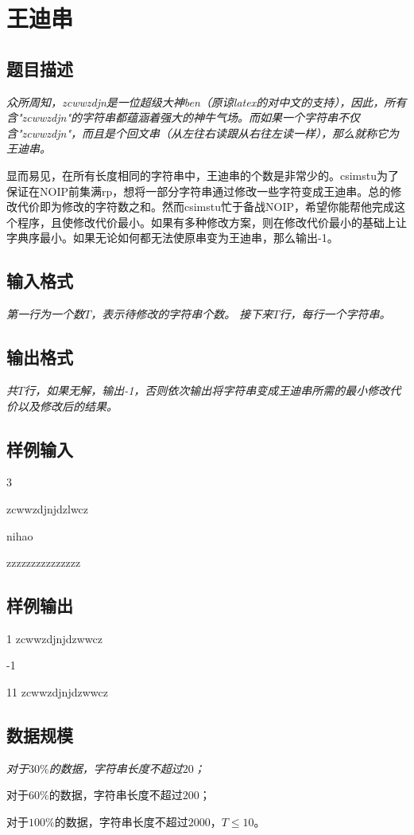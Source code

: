 \section{王迪串}
\subsection{题目描述}
{\it
众所周知，zcwwzdjn是一位超级大神{\color{red}ben}（原谅latex的对中文的支持），因此，所有含"zcwwzdjn"的字符串都蕴涵着强大的神牛气场。而如果一个字符串不仅含"zcwwzdjn"，而且是个回文串（从左往右读跟从右往左读一样），那么就称它为王迪串。\par
显而易见，在所有长度相同的字符串中，王迪串的个数是非常少的。csimstu为了保证在NOIP前集满rp，想将一部分字符串通过修改一些字符变成王迪串。总的修改代价即为修改的字符数之和。然而csimstu忙于备战NOIP，希望你能帮他完成这个程序，且使修改代价最小。如果有多种修改方案，则在修改代价最小的基础上让字典序最小。如果无论如何都无法使原串变为王迪串，那么输出-1。
}
\subsection{输入格式}
{\it
	第一行为一个数$T$，表示待修改的字符串个数。
	接下来$T$行，每行一个字符串。
}
\subsection{输出格式}
{\it
	共$T$行，如果无解，输出-1，否则依次输出将字符串变成王迪串所需的最小修改代价以及修改后的结果。
}
\subsection{样例输入}
3 \par
zcwwzdjnjdzlwcz \par
nihao \par
zzzzzzzzzzzzzzz
\subsection{样例输出}
1 zcwwzdjnjdzwwcz \par
-1 \par
11 zcwwzdjnjdzwwcz 
\subsection{数据规模}
{\it
对于$30\%$的数据，字符串长度不超过$20$；\par
对于$60\%$的数据，字符串长度不超过$200$；\par
对于$100\%$的数据，字符串长度不超过$2000$，$T \le 10$。
}

